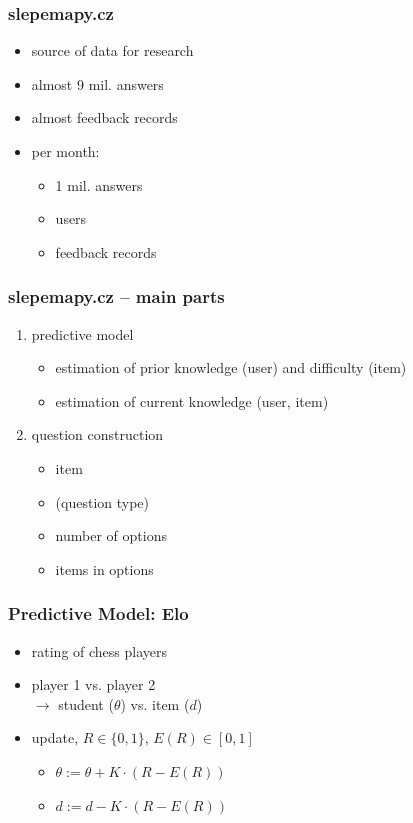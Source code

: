 \documentclass[xcolor=svgnames]{beamer}
\begin{document}
\begin{frame}
	\frametitle{slepemapy.cz}
	\begin{itemize}
		\item source of data for research
		\item almost 9 mil. answers
		\item almost  feedback records
		\item per month:
			\begin{itemize}
				\item 1 mil. answers
				\item {} users
				\item {} feedback records
			\end{itemize}
	\end{itemize}
\end{frame}
\begin{frame}
	\frametitle{slepemapy.cz -- main parts}
	\begin{enumerate}
		\item predictive model
			\begin{itemize}
				\item estimation of prior knowledge (user) and difficulty (item)
				\item estimation of current knowledge (user, item)
			\end{itemize}
		\item question construction
			\begin{itemize}
				\item item
				\item (question type)
				\item number of options
				\item items in options
			\end{itemize}
	\end{enumerate}
\end{frame}
\begin{frame}
	\frametitle{Predictive Model: Elo}
	\begin{itemize}
		\item rating of chess players
		\item player 1 vs. player 2\\ $\rightarrow$ student ($\theta$) vs. item ($d$)
		\item update, $R \in \{0, 1\}$, $E(R) \in [0, 1]$
		 \begin{itemize}
			\item $ \theta := \theta + K \cdot (R - E(R))$
			\item $ d := d - K \cdot (R - E(R))$
		 \end{itemize}
	\end{itemize}
\end{frame}
\end{document}
